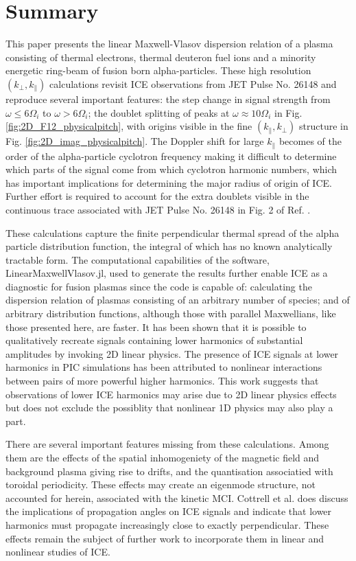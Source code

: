 \documentclass[12pt]{iopart}
\begin{document}
\section{Summary}

This paper presents the linear Maxwell-Vlasov dispersion relation of a plasma
consisting of thermal electrons, thermal deuteron fuel ions and a minority
energetic ring-beam of fusion born alpha-particles. These high resolution
$(k_\perp, k_\parallel)$ calculations revisit ICE observations from JET Pulse
No. 26148\cite{Cottrell1993,Dendy1995} and reproduce several important features:
the step change in signal strength from $\omega \leq 6\Omega_i$
to $\omega > 6\Omega_i$; the
doublet splitting of peaks at $\omega \approx 10\Omega_i$ in Fig.
\ref{fig:2D_F12_physicalpitch}, with origins visible in the fine $(k_\parallel,
k_\perp)$ structure in Fig. \ref{fig:2D_imag_physicalpitch}. The Doppler shift
for large $k_\parallel$ becomes of the order of the alpha-particle cyclotron
frequency making it difficult to determine which parts of the signal come
from which cyclotron harmonic numbers, which has important implications for
determining the major radius of origin of ICE.
Further effort is required to account for
the extra doublets visible in the continuous trace associated with JET Pulse No.
26148 in Fig. 2 of Ref. \cite{Cottrell1993}.


These calculations capture the finite perpendicular thermal spread of the alpha
particle distribution function, the integral of which has no known analytically
tractable form. The computational capabilities of the software,
LinearMaxwellVlasov.jl, used to generate the results further enable ICE as
a diagnostic for fusion plasmas since the code is capable of: calculating the
dispersion relation of plasmas consisting of an arbitrary number of species; and
of arbitrary distribution functions, although those with parallel Maxwellians,
like those presented here, are faster. It has been shown that it is possible to
qualitatively recreate signals containing lower harmonics of substantial amplitudes by
invoking 2D linear physics. The presence of ICE signals at lower harmonics in
PIC simulations has been attributed to nonlinear interactions between pairs of
more powerful higher harmonics\cite{Carbajal2014}. This work suggests that
observations of lower ICE harmonics may arise due to 2D
linear physics effects but does not exclude the possiblity that nonlinear 1D
physics\cite{Chapman2018} may also play a part.

There are several important features missing from these calculations. Among them
are the effects of the spatial inhomogeniety of the magnetic field and background
plasma giving rise to drifts,
and the quantisation associatied with toroidal periodicity. These
effects may create an eigenmode structure, not accounted for herein,
associated with the kinetic MCI.
Cottrell et al. \cite{Cottrell1993} does discuss the implications of propagation
angles on ICE signals and indicate that lower harmonics must propagate
increasingly close to exactly perpendicular. These effects remain the subject of
further work to incorporate them in linear and nonlinear studies of ICE.
\end{document}
